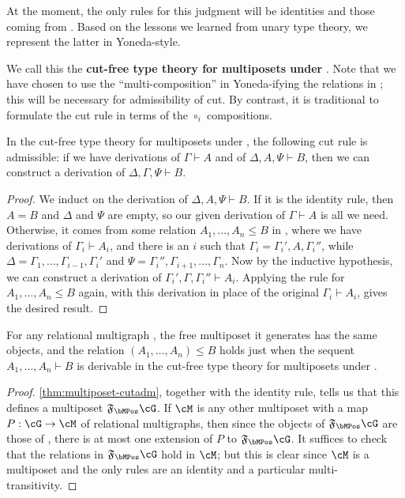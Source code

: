 \documentclass{book}
\let\types\vdash
\newcommand{\F}[1]{\mathfrak{F}_{#1}}
\begin{document}
At the moment, the only rules for this judgment will be identities and those coming from \cG.
Based on the lessons we learned from unary type theory, we represent the latter in Yoneda-style.
We call this the \textbf{cut-free type theory for multiposets under \cG}.
Note that we have chosen to use the ``multi-composition'' in Yoneda-ifying the relations in \cG; this will be necessary for admissibility of cut.
By contrast, it is traditional to formulate the cut rule in terms of the $\circ_i$ compositions.

\begin{thm}\label{thm:multiposet-cutadm}
  In the cut-free type theory for multiposets under \cG, the following cut rule is admissible: if we have derivations of $\Gamma\types A$ and of $\Delta,A,\Psi\types B$, then we can construct a derivation of $\Delta,\Gamma,\Psi\types B$.
\end{thm}
\begin{proof}
  We induct on the derivation of $\Delta,A,\Psi\types B$.
  If it is the identity rule, then $A=B$ and $\Delta$ and $\Psi$ are empty, so our given derivation of $\Gamma\types A$ is all we need.
  Otherwise, it comes from some relation $A_1,\dots,A_n \le B$ in \cG, where we have derivations of $\Gamma_i \types A_i$, and there is an $i$ such that $\Gamma_i = \Gamma_i',A,\Gamma_i''$, while $\Delta = \Gamma_1,\dots,\Gamma_{i-1},\Gamma_i'$ and $\Psi = \Gamma_i'',\Gamma_{i+1},\dots,\Gamma_n$.
  Now by the inductive hypothesis, we can construct a derivation of $\Gamma_i',\Gamma,\Gamma_i''\types A_i$.
  Applying the rule for $A_1,\dots,A_n \le B$ again, with this derivation in place of the original $\Gamma_i \types A_i$, gives the desired result.
\end{proof}

\begin{thm}\label{thm:multiposet-initial}
  For any relational multigraph \cG, the free multiposet it generates has the same objects, and the relation $(A_1,\dots,A_n)\le B$ holds just when the sequent $A_1,\dots,A_n\types B$ is derivable in the cut-free type theory for multiposets under \cG.
\end{thm}
\begin{proof}
  \cref{thm:multiposet-cutadm}, together with the identity rule, tells us that this defines a multiposet $\F\bMPos\cG$.
  If $\cM$ is any other multiposet with a map $P:\cG\to\cM$ of relational multigraphs, then since the objects of $\F\bMPos\cG$ are those of \cG, there is at most one extension of $P$ to $\F\bMPos\cG$.
  It suffices to check that the relations in $\F\bMPos\cG$ hold in $\cM$; but this is clear since $\cM$ is a multiposet and the only rules are an identity and a particular multi-transitivity.
\end{proof}
\end{document}
